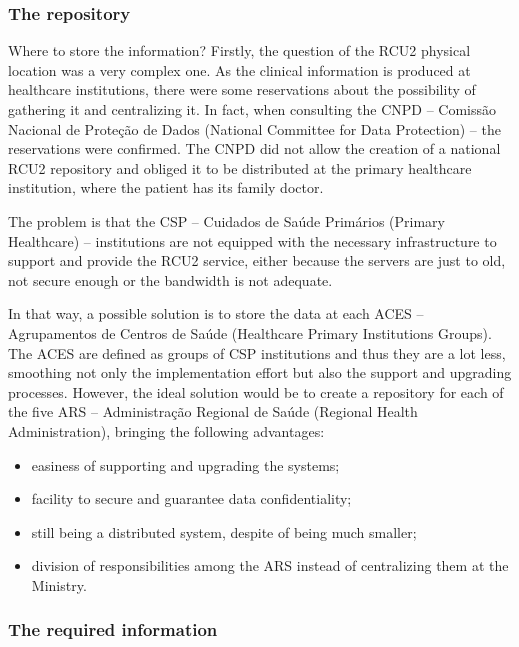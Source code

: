 \subsubsection{The repository}

Where to store the information? Firstly, the question of the RCU2 physical location was a very complex one. As the clinical information is produced at healthcare institutions, there were some reservations about the possibility of gathering it and centralizing it. In fact, when consulting the CNPD -- Comissão Nacional de Proteção de Dados (National Committee for Data Protection) -- the reservations were confirmed. The CNPD did not allow the creation of a national RCU2 repository and obliged it to be distributed at the primary healthcare institution, where the patient has its family doctor.

The problem is that the CSP -- Cuidados de Saúde Primários (Primary Healthcare) -- institutions are not equipped with the necessary infrastructure to support and provide the RCU2 service, either because the servers are just to old, not secure enough or the bandwidth is not adequate.

In that way, a possible solution is to store the data at each ACES -- Agrupamentos de Centros de Saúde (Healthcare Primary Institutions Groups). The ACES are defined as groups of CSP institutions and thus they are a lot less, smoothing not only the implementation effort but also the support and upgrading processes. However, the ideal solution would be to create a repository for each of the five ARS -- Administração Regional de Saúde (Regional Health Administration), bringing the following advantages:
\begin{itemize}
\item easiness of supporting and upgrading the systems;
\item facility to secure and guarantee data confidentiality;
\item still being a distributed system, despite of being much smaller;
\item division of responsibilities among the ARS instead of centralizing them at the Ministry.
\end{itemize}



\subsubsection{The required information}


